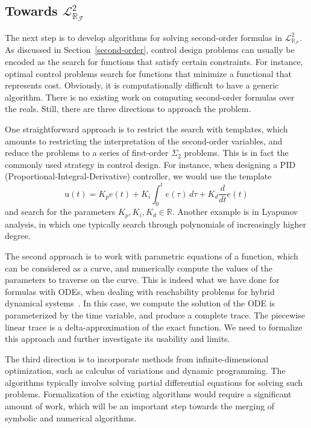 \documentclass[11pt]{article}
\newcommand{\lrf}{\mathcal{L}_{\mathbb{R}_{\mathcal{F}}}}
\theoremstyle{definition}
\begin{document}
\subsection{Towards $\lrf^2$} 

The next step is to develop algorithms for solving second-order formulas in $\lrf^2$. As discussed in Section~\ref{second-order}, control design problems can usually be encoded as the search for functions that satisfy certain constraints. For instance, optimal control problems search for functions that minimize a functional that represents cost. Obviously, it is computationally difficult to have a generic algorithm. There is no existing work on computing second-order formulas over the reals. Still, there are three directions to approach the problem. 

One straightforward approach is to restrict the search with templates, which amounts to restricting the interpretation of the second-order variables, and reduce the problems to a series of first-order $\Sigma_2$ problems. This is in fact the commonly used strategy in control design. For instance, when designing a PID (Proportional-Integral-Derivative) controller, we would use the template 
$$\mathrm{u}(t)= K_p{e(t)} + K_{i}\int_{0}^{t}{e(\tau)}\,{d\tau} + K_{d}\frac{d}{dt}e(t)$$
and search for the parameters $K_p, K_i, K_d\in \mathbb{R}$. Another example is in Lyapunov analysis, in which one typically search through polynomials of increasingly higher degree. 

The second approach is to work with parametric equations of a function, which can be considered as a curve, and numerically compute the values of the parameters to traverse on the curve. This is indeed what we have done for formulas with ODEs, when dealing with reachability problems for hybrid dynamical systems~\cite{DBLP:conf/fmcad/GaoKC13}. In this case, we compute the solution of the ODE is parameterized by the time variable, and produce a complete trace. The piecewise linear trace is a delta-approximation of the exact function. We need to formalize this approach and further investigate its usability and limits. 

The third direction is to incorporate methods from infinite-dimensional optimization, such as calculus of variations and dynamic programming. The algorithms typically involve solving partial differential equations for solving such problems. Formalization of the existing algorithms would require a significant amount of work, which will be an important step towards the merging of symbolic and numerical algorithms. 
\end{document}
